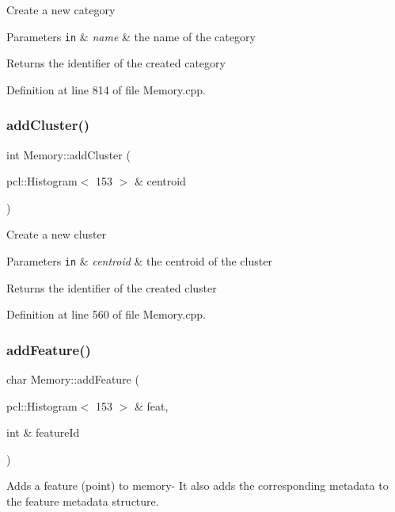 Create a new category


\begin{DoxyParams}[1]{Parameters}
\mbox{\tt in}  & {\em name} & the name of the category\\
\hline
\end{DoxyParams}
Returns the identifier of the created category 

Definition at line 814 of file Memory.\+cpp.

\mbox{\label{class_memory_ab71403837c0335a0e96a1e4814d4beb6}} 
\subsubsection{\texorpdfstring{add\+Cluster()}{addCluster()}}
{\footnotesize\ttfamily int Memory\+::add\+Cluster (\begin{DoxyParamCaption}\item[{pcl\+::\+Histogram$<$ 153 $>$ \&}]{centroid }\end{DoxyParamCaption})}

Create a new cluster


\begin{DoxyParams}[1]{Parameters}
\mbox{\tt in}  & {\em centroid} & the centroid of the cluster\\
\hline
\end{DoxyParams}
Returns the identifier of the created cluster 

Definition at line 560 of file Memory.\+cpp.

\mbox{\label{class_memory_a02592896aaa8a91632b5c959b0a5df4c}} 
\subsubsection{\texorpdfstring{add\+Feature()}{addFeature()}}
{\footnotesize\ttfamily char Memory\+::add\+Feature (\begin{DoxyParamCaption}\item[{pcl\+::\+Histogram$<$ 153 $>$ \&}]{feat,  }\item[{int \&}]{feature\+Id }\end{DoxyParamCaption})}

Adds a feature (point) to memory-\/ It also adds the corresponding metadata to the feature metadata structure.


